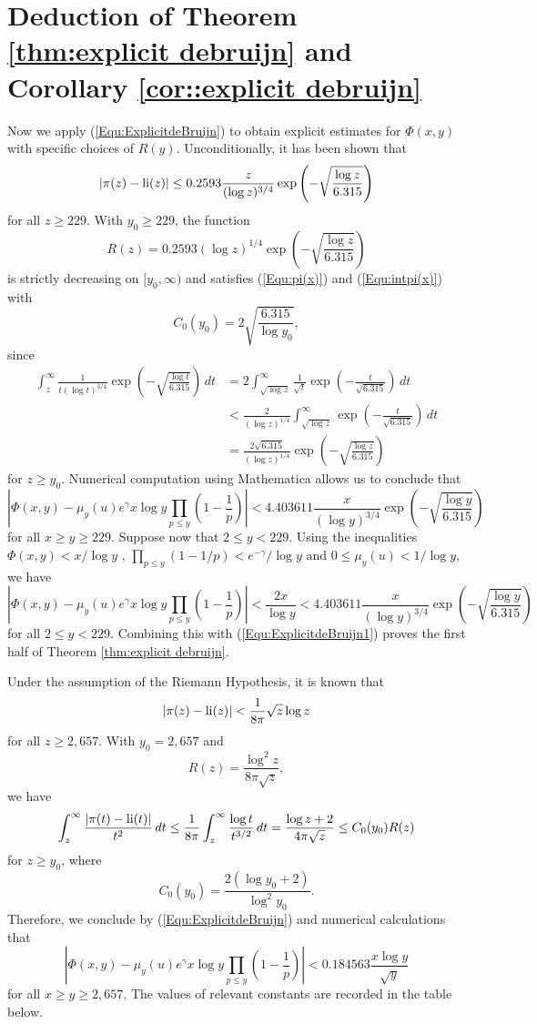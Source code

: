 \documentclass[12pt,reqno]{amsart}
\begin{document}
\section{Deduction of Theorem \ref{thm:explicit debruijn} and Corollary \ref{cor::explicit debruijn}}\label{S: Pf of Thm2&Cor3}
\par Now we apply (\ref{Equ:ExplicitdeBruijn}) to obtain explicit estimates for $\Phi(x,y)$ with specific choices of $R(y)$. Unconditionally, it has been shown \cite[Corollary 2]{MT} that
\[|\pi(z)-\operatorname{li}(z)|\le0.2593\frac{z}{(\log z)^{3/4}}\exp\left(-\sqrt{\frac{\log z}{6.315}}\right)\]
for all $z\ge229$. With $y_0\ge229$, the function
\[R(z)=0.2593(\log z)^{1/4}\exp\left(-\sqrt{\frac{\log z}{6.315}}\right)\]
is strictly decreasing on $[y_0,\infty)$ and satisfies (\ref*{Equ:pi(x)}) and (\ref*{Equ:intpi(x)}) with
\[C_0(y_0)=2\sqrt{\frac{6.315}{\log y_0}},\] 
since 
\begin{align*}
\int_{z}^{\infty}\frac{1}{t(\log t)^{3/4}}\exp\left(-\sqrt{\frac{\log t}{6.315}}\right)\,dt&=2\int_{\sqrt{\log z}}^{\infty}\frac{1}{\sqrt{t}}\exp\left(-\frac{t}{\sqrt{6.315}}\right)\,dt\\
&<\frac{2}{(\log z)^{1/4}}\int_{\sqrt{\log z}}^{\infty}\exp\left(-\frac{t}{\sqrt{6.315}}\right)\,dt\\
&=\frac{2\sqrt{6.315}}{(\log z)^{1/4}}\exp\left(-\sqrt{\frac{\log z}{6.315}}\right)
\end{align*}
for $z\ge y_0$. Numerical computation using Mathematica allows us to conclude that
\begin{equation}\label{Equ:ExplicitdeBruijn1}
\left|\Phi(x,y)-\mu_y(u)e^{\gamma}x\log y\prod_{p\leq y}\left(1-\frac{1}{p}\right)\right|< 4.403611\frac{x}{(\log y)^{3/4}}\exp\left(-\sqrt{\frac{\log y}{6.315}}\right)
\end{equation}
for all $x\ge y\ge 229$. Suppose now that $2\le y<229$. Using the inequalities $\Phi(x,y)<x/\log y$ \cite[Theorem]{F}, $\prod_{p\le y}(1-1/p)<e^{-\gamma}/\log y$ \cite[Theorem 23]{RS} and $0\le\mu_y(u)<1/\log y$, we have
\[\left|\Phi(x,y)-\mu_y(u)e^{\gamma}x\log y\prod_{p\leq y}\left(1-\frac{1}{p}\right)\right|<\frac{2x}{\log y}<4.403611\frac{x}{(\log y)^{3/4}}\exp\left(-\sqrt{\frac{\log y}{6.315}}\right)\]
for all $2\le y<229$. Combining this with (\ref{Equ:ExplicitdeBruijn1}) proves the first half of Theorem \ref{thm:explicit debruijn}. 
\par Under the assumption of the Riemann Hypothesis, 
it is known \cite[Corollary 1]{S} that
\[|\pi(z)-\operatorname{li}(z)|<\frac{1}{8\pi}\sqrt{z}\log z\]
for all $z\ge2{,}657$. With $y_0=2{,}657$ and
\[R(z)=\frac{\log^2z}{8\pi\sqrt{z}},\]
we have
\[\int_{z}^{\infty}\frac{|\pi(t)-\operatorname{li}(t)|}{t^2}\,dt\le \frac{1}{8\pi}\int_{z}^{\infty}\frac{\log t}{t^{3/2}}\,dt=\frac{\log z+2}{4\pi\sqrt{z}}\le C_0(y_0)R(z)\]
for $z\ge y_0$, where 
\[C_0(y_0)=\frac{2(\log y_0+2)}{\log^2 y_0}.\]
Therefore, we conclude by (\ref{Equ:ExplicitdeBruijn}) and numerical calculations that
\begin{equation}\label{Equ:ExplicitdeBruijn2}
\left|\Phi(x,y)-\mu_y(u)e^{\gamma}x\log y\prod_{p\leq y}\left(1-\frac{1}{p}\right)\right|< 0.184563\frac{x\log y}{\sqrt{y}}
\end{equation}
for all $x\ge y\ge 2{,}657$. The values of relevant constants are recorded in the table below.
\end{document}
